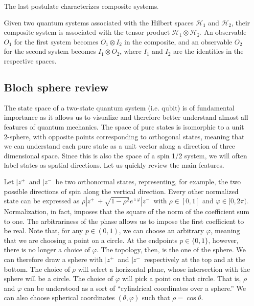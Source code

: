 The last postulate characterizes composite systems.
\renewcommand{\thepostulate}{COMP}
\begin{postulate}\label{rp_qm_postComp}
	Given two quantum systems associated with the Hilbert spaces $\mathcal{H}_1$ and $\mathcal{H}_2$, their composite system is associated with the tensor product $\mathcal{H}_1 \otimes \mathcal{H}_2$. An observable $O_1$ for the first system becomes $O_1 \otimes I_2$ in the composite, and an observable $O_2$ for the second system becomes $I_1 \otimes O_2$, where $I_1$ and $I_2$ are the identities in the respective spaces.
\end{postulate}
\renewcommand{\thepostulate}{\Roman{assump}}

\subsection{Bloch sphere review}

The state space of a two-state quantum system (i.e. qubit) is of fundamental importance as it allows us to visualize and therefore better understand almost all features of quantum mechanics. The space of pure states is isomorphic to a unit 2-sphere, with opposite points corresponding to orthogonal states, meaning that we can understand each pure state as a unit vector along a direction of three dimensional space. Since this is also the space of a spin 1/2 system, we will often label states as spatial directions. Let us quickly review the main features.

Let $|z^+\>$ and $|z^-\>$ be two orthonormal states, representing, for example, the two possible directions of spin along the vertical direction. Every other normalized state can be expressed as $\rho |z^+\> + \sqrt{1-\rho^2}e^{\imath \varphi} |z^-\>$ with $\rho \in [0,1]$ and $\varphi \in [0,2\pi)$. Normalization, in fact, imposes that the square of the norm of the coefficient sum to one. The arbitrariness of the phase allows us to impose the first coefficient to be real. Note that, for any $p \in (0,1)$, we can choose an arbitrary $\varphi$, meaning that we are choosing a point on a circle. At the endpoints $p \in \{0,1\}$, however, there is no longer a choice of $\varphi$. The topology, then, is the one of the sphere. We can therefore draw a sphere with $|z^+\>$ and $|z^-\>$ respectively at the top and at the bottom. The choice of $\rho$ will select a horizontal plane, whose intersection with the sphere will be a circle. The choice of $\varphi$ will pick a point on that circle. That is, $\rho$ and $\varphi$ can be understood as a sort of ``cylindrical coordinates over a sphere.'' We can also choose spherical coordinates $(\theta, \varphi)$ such that $\rho = \cos \theta$.


